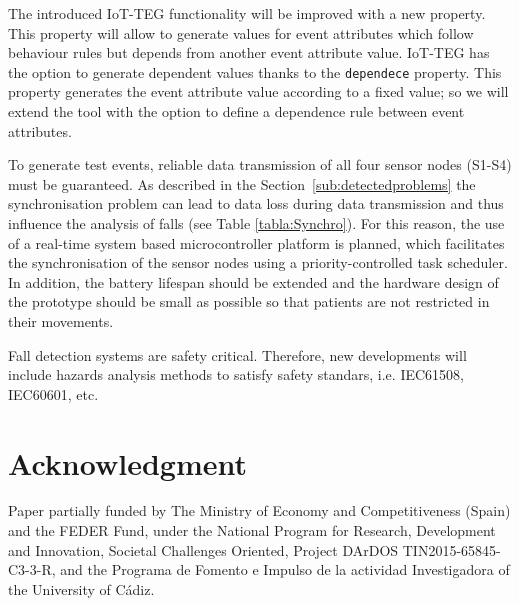 \documentclass[conference]{IEEEtran}
\theoremstyle{definition}
\begin{document}
The introduced IoT-TEG functionality will be improved with a new property. This property will allow to generate values 
for event attributes which follow behaviour rules but depends from another event attribute value. IoT-TEG has the option
to generate dependent values thanks to the \texttt{dependece} property. This property generates the event attribute value 
according to a fixed value; so we will extend the tool with the option to define a dependence rule between event attributes. 

To generate test events, reliable data transmission of all four sensor nodes (S1-S4) must be guaranteed. As described in 
the Section~\ref{sub:detectedproblems} the synchronisation problem can lead to data loss during data transmission and 
thus influence the analysis of falls (see Table \ref{tabla:Synchro}). For this reason, the use of a real-time system 
based microcontroller platform is planned, which facilitates the synchronisation of the sensor nodes using a 
priority-controlled task scheduler. In addition, the battery lifespan should be extended and the hardware design of the 
prototype should be small as possible so that patients are not restricted in their movements.

Fall detection systems are safety critical. Therefore, new developments will include hazards analysis methods
to satisfy safety standars, i.e. IEC61508, IEC60601, etc.

\section*{Acknowledgment}

Paper partially funded by The Ministry of Economy and Competitiveness (Spain) and the FEDER Fund, under the National Program for 
Research, Development and Innovation, Societal Challenges Oriented, Project DArDOS TIN2015-65845-C3-3-R, and the
Programa de Fomento e Impulso de la actividad Investigadora of the University of Cádiz.




\end{document}
